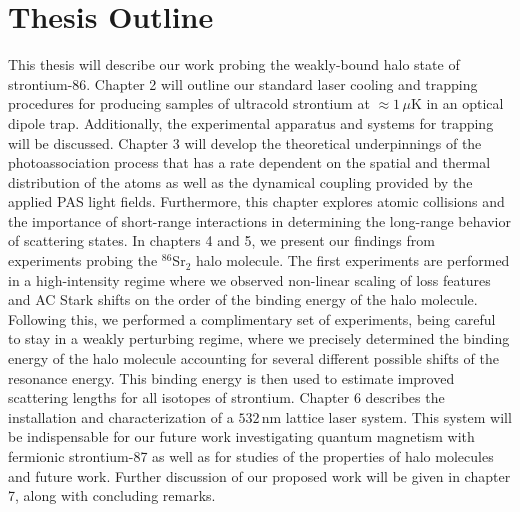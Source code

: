 \section{Thesis Outline} \label{sec:outline}
This thesis will describe our work probing the weakly-bound halo state of strontium-86.
Chapter 2 will outline our standard laser cooling and trapping procedures for producing samples of ultracold strontium at $\approx1\,\mu$K in an optical dipole trap. 
Additionally, the experimental apparatus and systems for trapping will be discussed.
Chapter 3 will develop the theoretical underpinnings of the photoassociation process that has a rate dependent on the spatial and thermal distribution of the atoms as well as the dynamical coupling provided by the applied PAS light fields.
Furthermore, this chapter explores atomic collisions and the importance of short-range interactions in determining the long-range behavior of scattering states.
In chapters 4 and 5, we present our findings from experiments probing the $^{86}$Sr$_2$ halo molecule.
The first experiments are performed in a high-intensity regime where we observed non-linear scaling of loss features and AC Stark shifts on the order of the binding energy of the halo molecule.
Following this, we performed a complimentary set of experiments, being careful to stay in a weakly perturbing regime, where we precisely determined the binding energy of the halo molecule accounting for several different possible shifts of the resonance energy.
This binding energy is then used to estimate improved scattering lengths for all isotopes of strontium.
Chapter 6 describes the installation and characterization of a $532$\,nm lattice laser system.
This system will be indispensable for our future work investigating quantum magnetism with fermionic strontium-87 as well as for studies of the properties of halo molecules and future work.
Further discussion of our proposed work will be given in chapter 7, along with concluding remarks.






%
%
%
%
%
%
%
%
%

